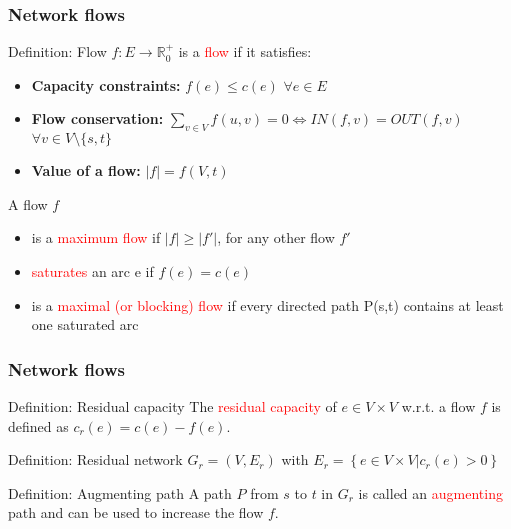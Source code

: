 \documentclass{beamer}
\begin{document}
\begin{frame}[shrink]
	\frametitle{Network flows}
	\begin{block}{Definition: Flow}
	$f:E \rightarrow \mathbb{R}_0^{+}$ is a \textcolor{red}{flow} if it satisfies:
	\begin{itemize}
		\item \textbf{Capacity constraints:} $f(e) \leq c(e)$ $\forall e \in E$
		\item \textbf{Flow conservation:} 
		$ \sum\limits_{v \in V} f(u,v) =  0 \Leftrightarrow IN(f,v) = OUT(f,v)$ $\forall v \in V \setminus \{s,t\}$
		\item \textbf{Value of a flow:} $\lvert f\rvert = f(V,t)$ 
	\end{itemize}
	\end{block}
	
	\begin{block}{A flow $f$}
	\begin{itemize}
		\item is a \textcolor{red}{maximum flow} if $\lvert f\rvert \geq \lvert f'\rvert$, for any other flow $f'$
		\item \textcolor{red}{saturates} an arc e if $f(e) = c(e)$
		\item is a \textcolor{red}{maximal (or blocking) flow} if every directed path P(s,t) contains at least one saturated arc
	\end{itemize}
	\end{block}
\end{frame}

\begin{frame}
	\frametitle{Network flows}
	\begin{block}{Definition: Residual capacity}
		The \textcolor{red}{residual capacity} of $e \in V \times V$ w.r.t. a flow $f$ is defined as $c_r(e) = c(e) - f(e)$. \\
	\end{block}
	
	\pause
	\begin{block}{Definition: Residual network}
		$G_r = (V, E_r)$ with $E_r = \left\{e \in V \times V \lvert c_r(e) > 0\right\}$
	\end{block}
	
	\pause
	\begin{block}{Definition: Augmenting path}
		A path $P$ from $s$ to $t$ in $G_r$ is called an \textcolor{red}{augmenting} path and can be used to increase the flow $f$.
	\end{block}
\end{frame}
\end{document}
